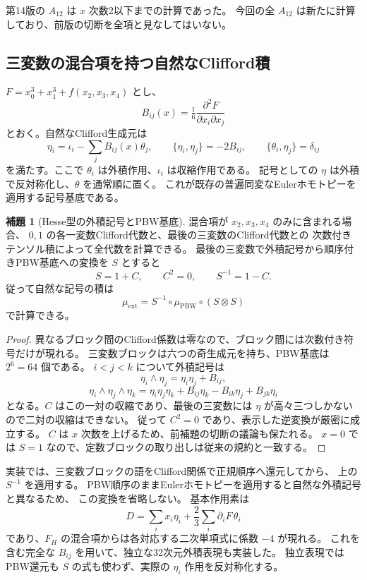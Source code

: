 \documentclass[a4paper,11pt]{ltjsarticle}
\theoremstyle{definition}
\newtheorem{lemma}[theorem]{補題}
\begin{document}
第14版の $A_{12}$ は $x$ 次数2以下までの計算であった。
今回の全 $A_{12}$ は新たに計算しており、前版の切断を全項と見なしてはいない。

\subsection{三変数の混合項を持つ自然なClifford積}

$F=x_0^3+x_1^3+f(x_2,x_3,x_4)$ とし、
\[
 B_{ij}(x)=\tfrac16\frac{\partial^2F}{\partial x_i\partial x_j}
\]
とおく。自然なClifford生成元は
\[
 \eta_i=\iota_i-\sum_jB_{ij}(x)\theta_j,
 \qquad \{\eta_i,\eta_j\}=-2B_{ij},\qquad
 \{\theta_i,\eta_j\}=\delta_{ij}
\]
を満たす。ここで $\theta_i$ は外積作用、$\iota_i$ は収縮作用である。
記号としての $\eta$ は外積で反対称化し、$\theta$ を通常順に置く。
これが既存の普遍同変なEulerホモトピーを適用する記号基底である。

\begin{lemma}[Hesse型の外積記号とPBW基底]
\label{lem:v15-hesse-symbol-product}
混合項が $x_2,x_3,x_4$ のみに含まれる場合、
$0,1$ の各一変数Clifford代数と、最後の三変数のClifford代数との
次数付きテンソル積によって全代数を計算できる。
最後の三変数で外積記号から順序付きPBW基底への変換を $S$ とすると
\[
 S=1+C,\qquad C^2=0,\qquad S^{-1}=1-C.
\]
従って自然な記号の積は
\[
 \mu_{\mathrm{ext}}=S^{-1}\circ\mu_{\mathrm{PBW}}\circ(S\otimes S)
\]
で計算できる。
\end{lemma}

\begin{proof}
異なるブロック間のClifford係数は零なので、ブロック間には次数付き符号だけが現れる。
三変数ブロックは六つの奇生成元を持ち、PBW基底は $2^6=64$ 個である。
$i<j<k$ について外積記号は
\[
 \eta_i\wedge\eta_j=\eta_i\eta_j+B_{ij},
\]
\[
 \eta_i\wedge\eta_j\wedge\eta_k
  =\eta_i\eta_j\eta_k+B_{ij}\eta_k-B_{ik}\eta_j+B_{jk}\eta_i
\]
となる。$C$ はこの一対の収縮であり、最後の三変数には
$\eta$ が高々三つしかないので二対の収縮はできない。
従って $C^2=0$ であり、表示した逆変換が厳密に成立する。
$C$ は $x$ 次数を上げるため、前補題の切断の議論も保たれる。
$x=0$ では $S=1$ なので、定数ブロックの取り出しは従来の規約と一致する。
\end{proof}

実装では、三変数ブロックの語をClifford関係で正規順序へ還元してから、
上の $S^{-1}$ を適用する。
PBW順序のままEulerホモトピーを適用すると自然な外積記号と異なるため、
この変換を省略しない。
基本作用素は
\[
 D=\sum_i x_i\eta_i+\frac23\sum_i\partial_iF\,\theta_i
\]
であり、$F_H$ の混合項からは各対応する二次単項式に係数 $-4$ が現れる。
これを含む完全な $B_{ij}$ を用いて、独立な32次元外積表現も実装した。
独立表現ではPBW還元も $S$ の式も使わず、実際の $\eta_i$ 作用を反対称化する。
\end{document}
